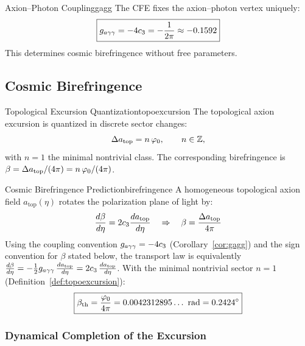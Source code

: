 \begin{corollary}{Axion--Photon Coupling}{gagg}
The CFE fixes the axion--photon vertex uniquely:
\begin{equation}
    \boxed{g_{a\gamma\gamma} = -4c_3 = -\frac{1}{2\pi} \approx -0.1592}
\end{equation}
This determines cosmic birefringence without free parameters.
\end{corollary}

\subsection{Cosmic Birefringence}

\begin{definition}{Topological Excursion Quantization}{topoexcursion}
The topological axion excursion is quantized in discrete sector changes:
\begin{equation}
    \Delta a_{\text{top}} = n\,\varphi_0, \qquad n\in\mathbb{Z},
\end{equation}
with $n=1$ the minimal nontrivial class. The corresponding birefringence is
$\beta = \Delta a_{\text{top}}/(4\pi) = n\,\varphi_0/(4\pi)$.
\end{definition}

\begin{theorem}{Cosmic Birefringence Prediction}{birefringence}
A homogeneous topological axion field $a_{\text{top}}(\eta)$ rotates the polarization plane of light by:
\begin{equation}
    \frac{d\beta}{d\eta} = 2c_3\frac{da_{\text{top}}}{d\eta} 
    \quad\Rightarrow\quad 
    \beta = \frac{\Delta a_{\text{top}}}{4\pi}
\end{equation}
Using the coupling convention $g_{a\gamma\gamma}=-4c_3$ (Corollary~\ref{cor:gagg}) and the sign convention for $\beta$ stated below, the transport law is equivalently
$\frac{d\beta}{d\eta} = -\frac{1}{2}g_{a\gamma\gamma}\,\frac{da_{\text{top}}}{d\eta} = 2c_3\,\frac{da_{\text{top}}}{d\eta}$.
With the minimal nontrivial sector $n=1$ (Definition~\ref{def:topoexcursion}):
\begin{equation}
    \boxed{\beta_{\text{th}} = \frac{\varphi_0}{4\pi} = 0.0042312895\ldots~\text{rad} = 0.2424^\circ}
\end{equation}
\end{theorem}

\subsubsection{Dynamical Completion of the Excursion}
\label{sec:deltaa}


